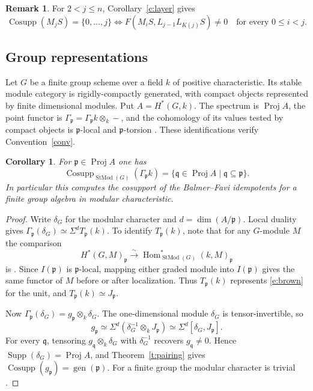 \documentclass[11pt,reqno]{amsart}
\newtheorem{corollary}[theorem]{Corollary}
\theoremstyle{definition}
\newtheorem{remark}[theorem]{Remark}
\DeclareMathOperator{\Cosupp}{Cosupp}
\DeclareMathOperator{\Supp}{Supp}
\DeclareMathOperator{\gen}{gen}
\DeclareMathOperator{\Proj}{Proj}
\DeclareMathOperator{\Hom}{Hom}
\DeclareMathOperator{\StMod}{StMod}
\newcommand{\p}{\mathfrak p}
\newcommand{\q}{\mathfrak q}
\numberwithin{equation}{section}
\begin{document}
\begin{remark}
For $2<j\le n$, Corollary~\ref{c:layer} gives
\[
 \Cosupp(M_jS)=\{0,\ldots,j\}
 \iff F(M_iS,L_{j-1}L_{K(j)}S)\ne0\quad\text{for every }0\le i<j .
\]
\end{remark}

\subsection{Group representations}
Let $G$ be a finite group scheme over a field $k$ of positive characteristic. Its stable module category is rigidly-compactly generated, with compact objects represented by finite dimensional modules. Put $A=H^*(G,k)$. The spectrum is $\Proj A$, the point functor is $\Gamma_{\p}=\Gamma_{\p}k\otimes_k-$, and the cohomology of its values tested by compact objects is $\p$-local and $\p$-torsion \cite{strat,bikp}. These identifications verify Convention~\ref{conv}.

\begin{corollary}\label{c:groups}
For $\p\in\Proj A$ one has
\[
 \Cosupp_{\StMod(G)}(\Gamma_{\p} k)
 =\{\q\in\Proj A\mid \q\subseteq\p\}.
\]
In particular this computes the cosupport of the Balmer--Favi idempotents for a finite group algebra in modular characteristic.
\end{corollary}
\begin{proof}
Write $\delta_G$ for the modular character and $d=\dim(A/\p)$. Local duality \cite[Theorem~5.1]{bikp} gives $\Gamma_{\p}(\delta_G)\simeq\Sigma^dT_{\p}(k)$. To identify $T_{\p}(k)$, note that for any $G$-module $M$ the comparison
\[
 H^*(G,M)_{\p}\xrightarrow{\sim}
       \Hom^*_{\StMod(G)}(k,M)_{\p}
\]
is \cite[(2.7)]{bikp}. Since $I(\p)$ is $\p$-local, mapping either graded module into $I(\p)$ gives the same functor of $M$ before or after localization. Thus $T_{\p}(k)$ represents \eqref{e:brown} for the unit, and $T_{\p}(k)\simeq J_{\p}$.

Now $\Gamma_{\p}(\delta_G)=g_{\p}\otimes_k\delta_G$. The one-dimensional module $\delta_G$ is tensor-invertible, so
\[
 g_{\p}\simeq\Sigma^d(\delta_G^{-1}\otimes_kJ_{\p})
             \simeq\Sigma^d[\delta_G,J_{\p}].
\]
For every $\q$, tensoring $g_{\q}\otimes_k\delta_G$ with $\delta_G^{-1}$ recovers $g_{\q}\ne0$. Hence $\Supp(\delta_G)=\Proj A$, and Theorem~\ref{t:pairing} gives $\Cosupp(g_{\p})=\gen(\p)$. For a finite group the modular character is trivial \cite[\S5]{bikp}.
\end{proof}
\end{document}
